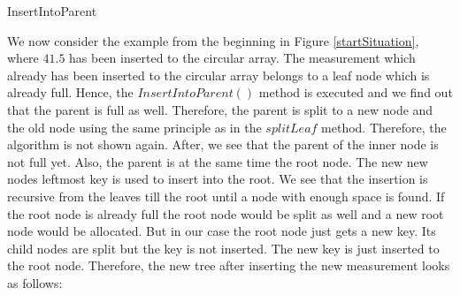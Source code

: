 \documentclass[abstracton,12pt]{scrreprt}
\begin{document}
\begin{algorithm}[H]
	\IncMargin{1em}
	\SetAlgoLined
	\DontPrintSemicolon
	
	
	

	\caption{InsertIntoParent}	\label{InsertIntoParent}
\end{algorithm}


\begin{exmp}
We now consider the example from the beginning in Figure \ref{startSituation}, where $41.5$ has been inserted to the circular array. The measurement which already has been inserted to the circular array belongs to a leaf node which is already full. Hence, the $InsertIntoParent()$ method is executed and we find out that the parent is full as well. Therefore, the parent is split to a new node and the old node using the same principle as in the $split Leaf$ method. Therefore, the algorithm is not shown again. After, we see that the parent of the inner node is not full yet. Also, the parent is at the same time the root node. The new new nodes leftmost key is used to insert into the root. We see that the insertion is recursive from the leaves till the root until a node with enough space is found. If the root node is already full the root node would be split as well and a new root node would be allocated. But in our case the root node just gets a new key. Its child nodes are split but the key is not inserted. The new key is just inserted to the root node. Therefore, the new tree after inserting the new measurement looks as follows:  
\end{exmp}
\end{document}
